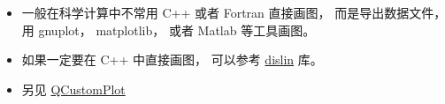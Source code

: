 
\begin{issues}
\issueDraft
\end{issues}

\begin{itemize}
\item 一般在科学计算中不常用 C++ 或者 Fortran 直接画图， 而是导出数据文件， 用 gnuplot， matplotlib， 或者 Matlab 等工具画图。
\item 如果一定要在 C++ 中直接画图， 可以参考 \href{https://www.dislin.de/}{dislin} 库。
\item 另见 \href{https://www.qcustomplot.com/}{QCustomPlot}
\end{itemize}
